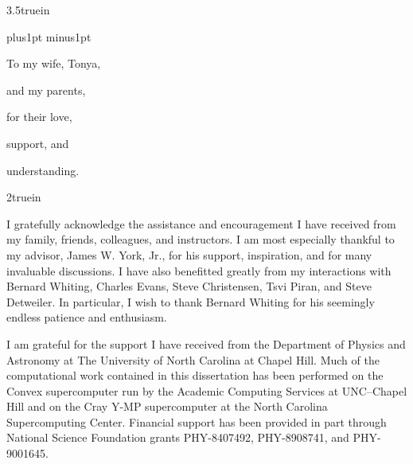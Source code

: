 \topskip 3.5truein
{
\baselineskip=10pt plus1pt minus1pt
\centerline{To my wife, Tonya,}
\centerline{and my parents,}
\centerline{for their love,}
\centerline{support, and}
\centerline{understanding.}
}
\vfill
\eject

\topskip 2truein
{\baselineskip 14pt
}
\vfill
\eject


I gratefully acknowledge the assistance and encouragement I have received from
my family, friends, colleagues, and instructors.  I am most especially thankful
to my advisor, James W. York, Jr., for his support, inspiration, and for many
invaluable discussions.  I have also benefitted greatly from my interactions
with Bernard Whiting, Charles Evans, Steve Christensen, Tsvi Piran, and Steve
Detweiler.  In particular, I wish to thank Bernard Whiting for his seemingly
endless patience and enthusiasm.

I am grateful for the support I have received from the Department of Physics and
Astronomy at The University of North Carolina at Chapel Hill.  Much of the
computational work contained in this dissertation has been performed on the
Convex supercomputer run by the Academic Computing Services at UNC--Chapel Hill
and  on the Cray Y-MP supercomputer at the North Carolina Supercomputing
Center.  Financial support has been provided in part through National Science
Foundation grants PHY-8407492, PHY-8908741, and PHY-9001645.

\vfill
\eject